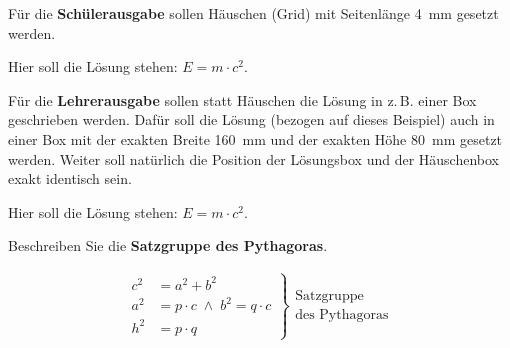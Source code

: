 \documentclass[fontsize=12pt,parskip=half]{scrartcl}
\begin{document}
\begin{exercise}
  Für die \textbf{Schülerausgabe} sollen Häuschen (Grid) mit Seitenlänge
  \SI{4}{\mm} gesetzt werden.
\end{exercise}
\begin{solution}
  Hier soll die Lösung stehen: $E=m\cdot c^2$.
\end{solution}


\begin{exercise}
  Für die \textbf{Lehrerausgabe} sollen statt Häuschen die Lösung in
  z.\,B. einer Box geschrieben werden. Dafür soll die Lösung (bezogen auf
  dieses Beispiel) auch in einer Box mit der exakten Breite \SI{160}{\mm} und
  der exakten Höhe \SI{80}{\mm} gesetzt werden. Weiter soll natürlich die
  Position der Lösungsbox und der Häuschenbox exakt identisch sein.
\end{exercise}
\begin{solution}
  Hier soll die Lösung stehen: $E=m\cdot c^2$.
\end{solution}

\clearpage

\begin{exercise}
  Beschreiben Sie die \textbf{Satzgruppe des Pythagoras}.
\end{exercise}
\begin{solution}
  \begin{align*}
    \left.\begin{aligned}
      c^2   &=a^2+b^2\\
      a^2   &=p\cdot c\;\wedge\; b^2=q\cdot c\\
      h^2   &=p\cdot q
    \end{aligned}\right\}
    \begin{gathered}
      \text{Satzgruppe}\\
      \text{des Pythagoras}
    \end{gathered}
  \end{align*}
\end{solution}
\end{document}
